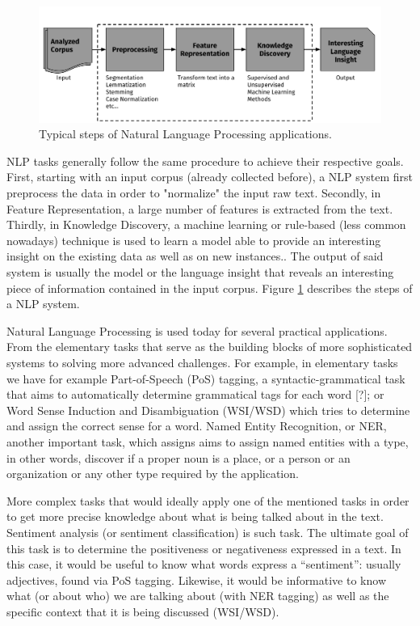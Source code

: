 \begin{figure}
\centering
\includegraphics[width=1\linewidth]{./images/Chapitre1/nlp_flow.pdf}
\caption{Typical steps of Natural Language Processing applications.}
\label{fig:nlpflow}
\end{figure}
NLP tasks generally follow the same procedure to achieve their respective goals. First, starting with an input corpus (already collected before), a NLP system first preprocess the data in order to "normalize" the input raw text. Secondly, in Feature Representation, a large number of features is extracted from the text. Thirdly, in Knowledge Discovery,  a machine learning or rule-based (less common nowadays) technique is used to  learn a model able to provide an interesting insight on the existing data as well as on new instances.. The output of said system is usually the model or the language insight that reveals an interesting piece of information contained in the input corpus. Figure \ref{fig:nlpflow} describes the steps of a NLP system. 

Natural Language Processing is used today for several practical applications. From the elementary tasks that serve as the building blocks of more sophisticated systems to solving more advanced challenges. For example, in elementary tasks we have for example Part-of-Speech (PoS) tagging, a syntactic-grammatical task that aims to automatically determine grammatical tags for each word [?]; or Word Sense Induction and Disambiguation (WSI/WSD) which tries to determine and assign the correct sense for a word. Named Entity Recognition, or NER, another important task, which assigns aims to assign named entities with a type, in other words, discover if a proper noun is a place, or a person or an organization or any other type required by the application. 

More complex tasks that would ideally apply one of the mentioned tasks in order to get more precise knowledge about what is being talked about in the text. Sentiment analysis (or sentiment classification) is such task. The ultimate goal of this task is to determine the positiveness or negativeness expressed in a text. In this case, it would be useful to know what words express a ``sentiment'': usually adjectives, found via PoS tagging. Likewise, it would be informative to know what (or about who) we are talking about (with NER tagging) as well as the specific context that it is being discussed (WSI/WSD). 



